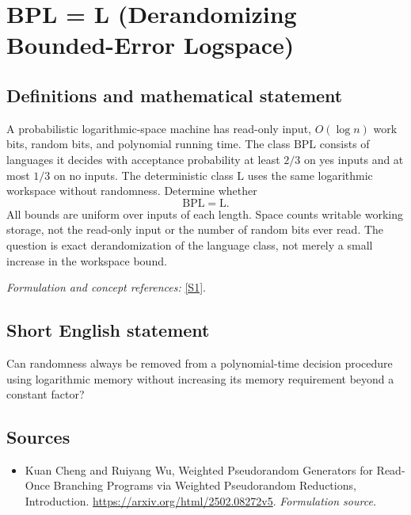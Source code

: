 \documentclass[11pt]{article}
\begin{document}
\section*{\texorpdfstring{BPL = L (Derandomizing Bounded-Error Logspace)}{BPL = L (Derandomizing Bounded-Error Logspace)}}\label{163}
\subsection{Definitions and mathematical statement}
A probabilistic logarithmic-space machine has read-only input, $O(\log n)$ work bits, random bits, and polynomial running time. The class $\mathrm{BPL}$ consists of languages it decides with acceptance probability at least $2/3$ on yes inputs and at most $1/3$ on no inputs. The deterministic class $\mathrm L$ uses the same logarithmic workspace without randomness. Determine whether
\[
 \mathrm{BPL}=\mathrm L.
\]
All bounds are uniform over inputs of each length. Space counts writable working storage, not the read-only input or the number of random bits ever read. The question is exact derandomization of the language class, not merely a small increase in the workspace bound.
\par\smallskip\textit{Formulation and concept references:} \href{https://arxiv.org/html/2502.08272v5}{[S1]}.

\subsection{Short English statement}
Can randomness always be removed from a polynomial-time decision procedure using logarithmic memory without increasing its memory requirement beyond a constant factor?
\subsection{Sources}
\begin{itemize}
\item[S1]Kuan Cheng and Ruiyang Wu, Weighted Pseudorandom Generators for Read-Once Branching Programs via Weighted Pseudorandom Reductions, Introduction.
\url{https://arxiv.org/html/2502.08272v5}.
\textit{Formulation source.}
\end{itemize}
\end{document}

